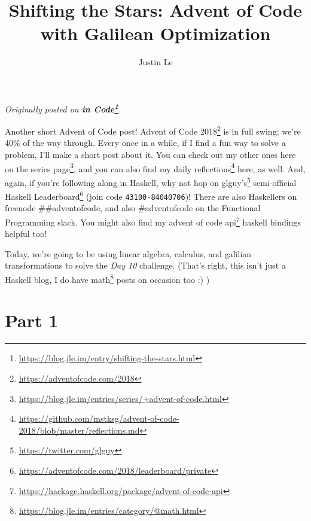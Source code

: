 \documentclass[]{article}
\title{Shifting the Stars: Advent of Code with Galilean Optimization}
\author{Justin Le}
\renewcommand{\href}[2]{#2\footnote{\url{#1}}}
\begin{document}
\maketitle

\emph{Originally posted on
\textbf{\href{https://blog.jle.im/entry/shifting-the-stars.html}{in Code}}.}

Another short Advent of Code post! \href{https://adventofcode.com/2018}{Advent
of Code 2018} is in full swing; we're 40\% of the way through. Every once in a
while, if I find a fun way to solve a problem, I'll make a short post about it.
You can check out my other ones
\href{https://blog.jle.im/entries/series/+advent-of-code.html}{here on the
series page}, and you can also find my
\href{https://github.com/mstksg/advent-of-code-2018/blob/master/reflections.md}{daily
reflections} here, as well. And, again, if you're following along in Haskell,
why not hop on \href{https://twitter.com/glguy}{glguy's} semi-official
\href{https://adventofcode.com/2018/leaderboard/private}{Haskell Leaderboard}
(join code \texttt{43100-84040706})! There are also Haskellers on freenode
\#\#adventofcode, and also \#adventofcode on the Functional Programming slack.
You might also find my
\href{https://hackage.haskell.org/package/advent-of-code-api}{advent of code
api} haskell bindings helpful too!

Today, we're going to be using linear algebra, calculus, and galilian
transformations to solve the \emph{Day 10} challenge. (That's right, this isn't
just a Haskell blog, I do have
\href{https://blog.jle.im/entries/category/@math.html}{math} posts on occasion
too :) )

\hypertarget{part-1}{%
\section{Part 1}\label{part-1}}
\end{document}
